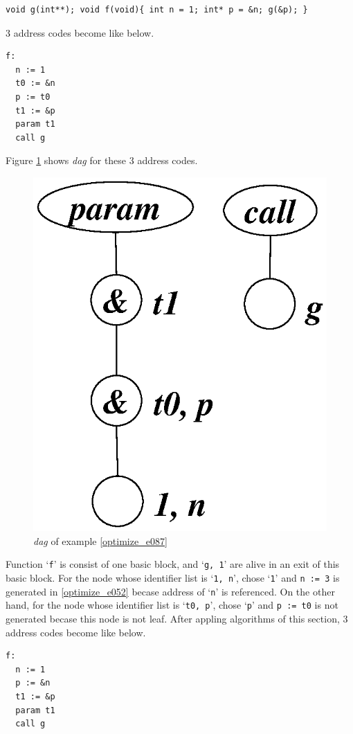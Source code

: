 \begin{Example}
\label{optimize_e087}
\begin{verbatim}
void g(int**); void f(void){ int n = 1; int* p = &n; g(&p); }
\end{verbatim}
3 address codes become like below.
\begin{verbatim}
f:
  n := 1
  t0 := &n
  p := t0
  t1 := &p
  param t1
  call g
\end{verbatim}
Figure \ref{optimize_e088} shows {\em dag} for these 3 address codes.
\begin{figure}[htbp]
\begin{center}
\includegraphics[width=0.392\linewidth,height=0.5\linewidth]{opt037.eps}
\caption{{\em dag} of example \ref{optimize_e087}}
\label{optimize_e088}
\end{center}
\end{figure}
Function `{\tt{f}}' is consist of one basic block,
and `{\tt{g, 1}}' are alive in an exit of this basic block.
For the node whose identifier list is `{\tt{1, n}}',
chose `{\tt{1}}' and {\tt{n := 3}} is generated in 
\ref{optimize_e052} becase address of `{\tt{n}}' is referenced.
On the other hand, for
the node whose identifier list is `{\tt{t0, p}}',
chose `{\tt{p}}' and {\tt{p := t0}} is not generated
becase this node is not leaf.
After appling algorithms of this section,
3 address codes become like below.
\begin{verbatim}
f:
  n := 1
  p := &n
  t1 := &p
  param t1
  call g
\end{verbatim}
\end{Example}

